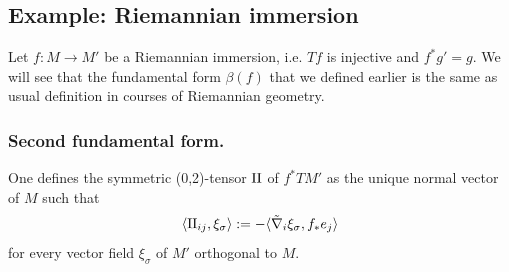\subsection{Example: Riemannian immersion}
\label{sec:org98c160d}
Let \(f: M \longrightarrow M'\) be a Riemannian immersion, i.e. \(Tf\) is injective and \(f^*g' = g\). We will
see that the fundamental form \(\beta(f)\) that we defined earlier is the same as usual definition in courses of Riemannian geometry.
\subsubsection{Second fundamental form.}
\label{sec:orgb1c33fa}
One defines the symmetric (0,2)-tensor \(\sff\) of \(f^*TM'\) as the unique normal vector of \(M\) such that
\[
\langle \sff_{ij},\xi_\sigma \rangle:= -\langle \tilde\nabla_i\xi_\sigma, f_* e_j\rangle
\]
for every vector field \(\xi_\sigma\) of \(M'\) orthogonal to \(M\).

